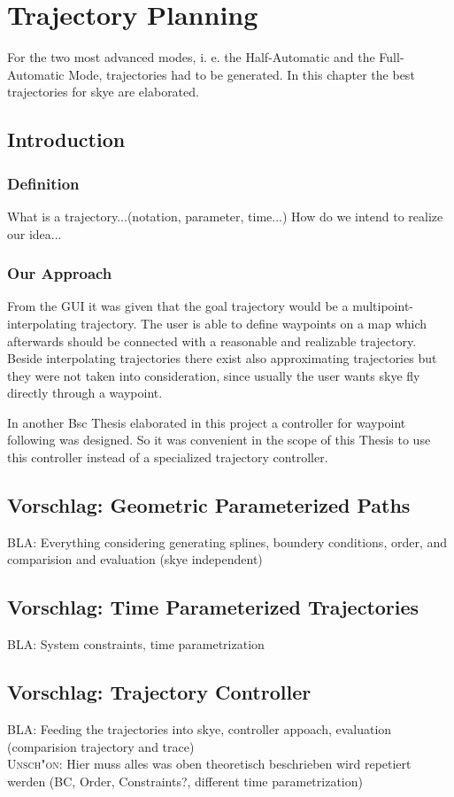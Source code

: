 \chapter{Trajectory Planning}
For the two most advanced modes, i. e. the Half-Automatic and the Full-Automatic Mode, trajectories had to be generated. In this chapter the best trajectories for skye are elaborated.

\section{Introduction}

\subsection{Definition}
What is a trajectory...(notation, parameter, time...)
How do we intend to realize our idea... 

\subsection{Our Approach}
From the GUI it was given that the goal trajectory would be a multipoint-interpolating trajectory. The user is able to define waypoints on a map which afterwards should be connected with a reasonable and realizable trajectory. Beside interpolating trajectories there exist also approximating trajectories but they were not taken into consideration, since usually the user wants skye fly directly through a waypoint.

In another Bsc Thesis elaborated in this project a controller for waypoint following was designed. So it was convenient in the scope of this Thesis to use this controller instead of a specialized trajectory controller.

\section{Vorschlag: Geometric Parameterized Paths}
BLA: Everything considering generating splines, boundery conditions, order, and comparision and evaluation (skye independent)
\section{Vorschlag: Time Parameterized Trajectories}
BLA: System constraints, time parametrization
\section{Vorschlag: Trajectory Controller}
BLA: Feeding the trajectories into skye, controller appoach, evaluation (comparision trajectory and trace) \\
\textsc{Unsch"on:} Hier muss alles was oben theoretisch beschrieben wird repetiert werden (BC, Order, Constraints?, different time parametrization)

